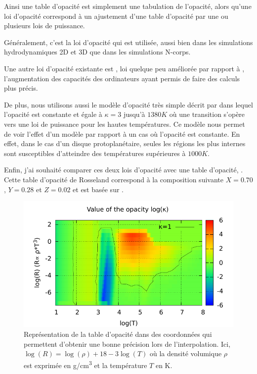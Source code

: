 Ainsi une table d'opacité est simplement une tabulation de l'opacité, alors qu'une loi d'opacité correspond à un ajustement d'une table d'opacité par
une ou plusieurs lois de puissance. 

\bigskip

Généralement, c'est la loi d'opacité \cite{bell1994FU} qui est utilisée, aussi bien dans les simulations hydrodynamiques 2D et
3D que dans les simulations N-corps. 

Une autre loi d'opacité existante est \cite{zhu2009nonsteady}, loi quelque peu améliorée par rapport à \cite{bell1994FU},
l'augmentation des capacités des ordinateurs ayant permis de faire des calculs plus précis. 

De plus, nous utilisons aussi le modèle d'opacité très simple décrit par \cite{chambers2009analytic} dans lequel l'opacité est
constante et égale à $\kappa=3$ jusqu'à $1380\unit{K}$ où une transition s'opère vers une loi de puissance pour les hautes températures. Ce modèle nous
permet de voir l'effet d'un modèle par rapport à un cas où l'opacité est constante. En effet, dans le cas d'un disque
protoplanétaire, seules les régions les plus internes sont susceptibles d'atteindre des températures supérieures à
$1000\unit{K}$. 

Enfin, j'ai souhaité comparer ces deux lois d'opacité avec une table d'opacité, \cite{hure2000transition} . Cette table
d'opacité de Rosseland correspond à la composition suivante $X=0.70$, $Y=0.28$ et $Z=0.02$ et est basée sur
\cite{seaton1994opacities, alexander1994low, henning1996dust}.

\begin{figure}[htbp]
\centering
\includegraphics[width=0.65\linewidth]{figure/hure_opacity_table.pdf}
\caption{Représentation de la table d'opacité \cite{hure2000transition} dans des coordonnées qui permettent d'obtenir une bonne précision lors de l'interpolation. Ici, $\log(R)=\log(\rho) + 18 -3\log(T)$ où la densité volumique $\rho$ est exprimée en \unit{g/cm^3} et la température $T$ en K.}\label{fig:hure_profile}
\end{figure}

